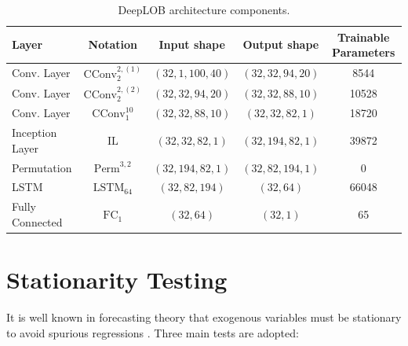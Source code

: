 \documentclass[10pt,a4paper,oneside]{article}
\DeclareMathOperator{\perm}{Perm}
\DeclareMathOperator{\fullyconnected}{FC}
\DeclareMathOperator{\lstm}{LSTM}
\begin{document}
\begin{table}[htb]
\centering
\begin{tabular}{@{}lcccc@{}}
\toprule
Layer           & Notation           & Input shape        & Output shape          & Trainable Parameters  \\ \midrule
Conv. Layer     & $\mathrm{CConv}^{2, (1)}_{2}$ & $(32, 1, 100, 40)$ & $(32, 32, 94, 20)$   & 8544                  \\
Conv. Layer     & $\mathrm{CConv}^{2, (2)}_2$   & $(32, 32, 94, 20)$ & $(32,  32,  88, 10)$ & 10528                 \\
Conv. Layer     & $\mathrm{CConv}^{10}_1$       & $(32, 32, 88, 10)$ & $(32, 32, 82, 1)$    & 18720                 \\
Inception Layer & $\mathrm{IL}$               & $(32,  32, 82, 1)$ & $(32, 194, 82, 1)$   & 39872                 \\
Permutation     & $\perm^{3,2}$        & $(32, 194, 82, 1)$ & $(32, 82, 194, 1)$   & 0                     \\
LSTM            & $\lstm_{64}$        & $(32, 82, 194)$    & $(32, 64)$           & 66048                 \\ 
Fully Connected & $\fullyconnected_{1}$    & $(32, 64)$         & $(32, 1)$            & 65   \\\bottomrule
\end{tabular}
\caption{DeepLOB architecture components.}
\label{tab:deeplob}
\end{table}



\clearpage
\section{Stationarity Testing}
\label{ap:stationarity_testing}

It is well known in forecasting theory that exogenous variables must be stationary to avoid spurious regressions \cite{xie2006spurious}. Three main tests are adopted:
\end{document}
